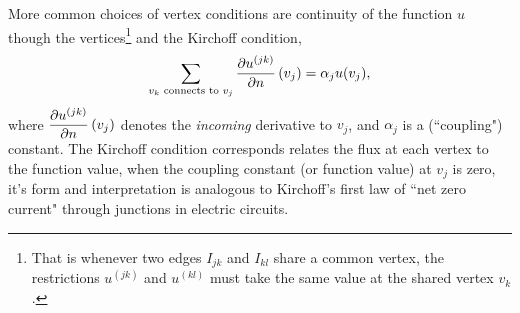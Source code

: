 More common choices of vertex conditions are continuity of the function $u$ though the vertices\footnote{That is whenever two edges $I_{jk}$ and $I_{kl}$ share a common vertex, the restrictions $u^{(jk)}$ and $u^{(kl)}$ must take the same value at the shared vertex $v_k$.} and the Kirchoff condition,
\begin{align*}
	\sum_{v_k \text{ connects to } v_j} 
	\dfrac{\partial u^{(jk)}}{\partial n}\left( v_j \right) = \alpha_j u(v_j),
\end{align*}
where $\dfrac{\partial u^{(jk)}}{\partial n}\left( v_j \right)$ denotes the \emph{incoming} derivative to $v_j$, and $\alpha_j$ is a (``coupling") constant. 
The Kirchoff condition corresponds relates the flux at each vertex to the function value, when the coupling constant (or function value) at $v_j$ is zero, it's form and interpretation is analogous to Kirchoff's first law of ``net zero current" through junctions in electric circuits.

